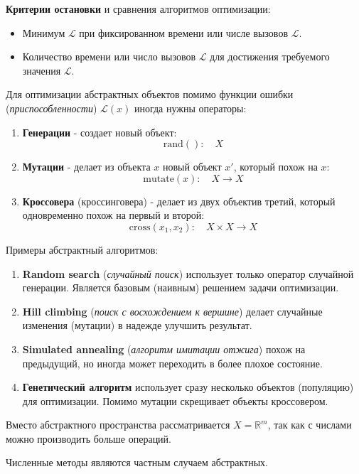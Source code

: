 \begin{definition}
    \textbf{Критерии остановки} и сравнения алгоритмов оптимизации:
    \begin{itemize}
        \item Минимум $\mathcal{L}$ при фиксированном времени или числе вызовов $\mathcal{L}$.
        \item Количество времени или число вызовов $\mathcal{L}$ для достижения требуемого значения $\mathcal{L}$.
    \end{itemize}
\end{definition}

Для оптимизации абстрактных объектов помимо функции ошибки (\textit{приспособленности}) $\mathcal{L}(x)$ иногда нужны операторы:
\begin{enumerate}
    \item \textbf{Генерации} - создает новый объект: \[\mathrm{rand}():\quad X\]
    \item \textbf{Мутации} - делает из объекта $x$ новый объект $x'$, который похож на $x$: \[\mathrm{mutate}(x):\quad X\to X\]
    \item \textbf{Кроссовера} (кроссинговера) - делает из двух объектив третий, который одновременно похож на первый и второй: \[\mathrm{cross}(x_1, x_2):\quad X \times X \to X\]
\end{enumerate}

Примеры абстрактный алгоритмов:
\begin{enumerate}
    \item \textbf{Random search} (\textit{случайный поиск}) использует только оператор случайной генерации. Является базовым (наивным) решением задачи оптимизации.
    \item \textbf{Hill climbing} (\textit{поиск с восхождением к вершине}) делает случайные изменения (мутации) в надежде улучшить результат.
    \item \textbf{Simulated annealing} (\textit{алгоритм имитации отжига}) похож на предыдущий, но иногда может переходить в более плохое состояние.
    \item \textbf{Генетический алгоритм} использует сразу несколько объектов (популяцию) для оптимизации. Помимо мутации скрещивает объекты кроссовером.
\end{enumerate}

Вместо абстрактного пространства рассматривается $X = \mathbb{R}^m$, так как с числами можно производить больше операций.

\begin{remark}
    Численные методы являются частным случаем абстрактных.
\end{remark}

